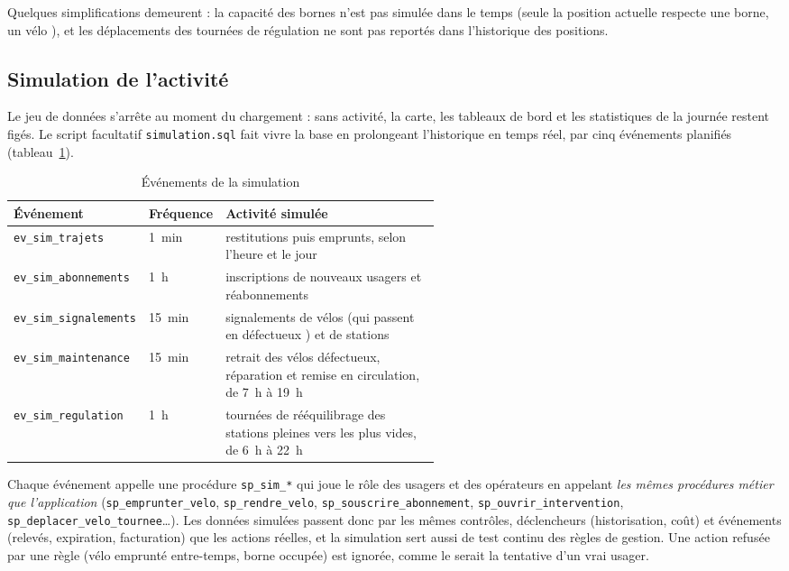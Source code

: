 Quelques simplifications demeurent : la capacité des bornes n'est pas simulée dans le temps (seule la position actuelle respecte \og une borne, un vélo \fg{}), et les déplacements des tournées de régulation ne sont pas reportés dans l'historique des positions.

\subsection{Simulation de l'activité}\label{sec:simulation}

Le jeu de données s'arrête au moment du chargement : sans activité, la carte, les tableaux de bord et les statistiques de la journée restent figés. Le script facultatif \texttt{simulation.sql} fait \og vivre \fg{} la base en prolongeant l'historique en temps réel, par cinq événements planifiés (tableau~\ref{tab:simulation}).

\begin{table}[htbp]\centering\small
	\begin{tabular}{l l >{\raggedright\arraybackslash}p{0.55\linewidth}}
		\toprule
		\textbf{Événement} & \textbf{Fréquence} & \textbf{Activité simulée} \\
		\midrule
		\texttt{ev\_sim\_trajets}      & 1~min  & restitutions puis emprunts, selon l'heure et le jour \\
		\texttt{ev\_sim\_abonnements}  & 1~h    & inscriptions de nouveaux usagers et réabonnements \\
		\texttt{ev\_sim\_signalements} & 15~min & signalements de vélos (qui passent en \og défectueux \fg{}) et de stations \\
		\texttt{ev\_sim\_maintenance}  & 15~min & retrait des vélos défectueux, réparation et remise en circulation, de 7~h à 19~h \\
		\texttt{ev\_sim\_regulation}   & 1~h    & tournées de rééquilibrage des stations pleines vers les plus vides, de 6~h à 22~h \\
		\bottomrule
	\end{tabular}
	\caption{Événements de la simulation}\label{tab:simulation}
\end{table}

Chaque événement appelle une procédure \texttt{sp\_sim\_*} qui joue le rôle des usagers et des opérateurs en appelant \emph{les mêmes procédures métier que l'application} (\texttt{sp\_emprunter\_velo}, \texttt{sp\_rendre\_velo}, \texttt{sp\_souscrire\_abonnement}, \texttt{sp\_ouvrir\_intervention}, \texttt{sp\_deplacer\_velo\_tournee}\ldots). Les données simulées passent donc par les mêmes contrôles, déclencheurs (historisation, coût) et événements (relevés, expiration, facturation) que les actions réelles, et la simulation sert aussi de test continu des règles de gestion. Une action refusée par une règle (vélo emprunté entre-temps, borne occupée) est ignorée, comme le serait la tentative d'un vrai usager.

